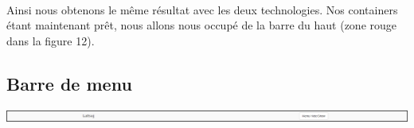 \documentclass{article}
\begin{document}
\vspace{0.5cm}\\
Ainsi nous obtenons le m\^eme r\'esultat avec les deux technologies. Nos containers \'etant maintenant pr\^et, nous allons nous occup\'e de la barre du haut (zone rouge dans la figure 12).

\subsection{Barre de menu}

\begin{center}
\vspace{0.5cm}
\includegraphics[width=\textwidth]{p19}
\end{center}
\end{document}
